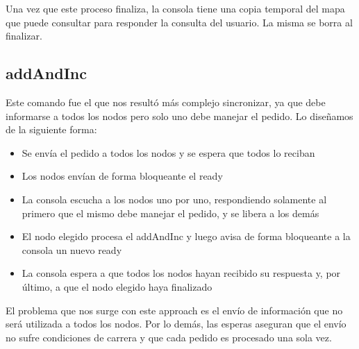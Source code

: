 Una vez que este proceso finaliza, la consola tiene una copia temporal del mapa que puede consultar para responder la consulta del usuario. La misma se borra al finalizar.

\subsection{addAndInc}

Este comando fue el que nos resultó más complejo sincronizar, ya que debe informarse a todos los nodos pero solo uno debe manejar el pedido. Lo diseñamos de la siguiente forma:

\begin{itemize}
	\item Se envía el pedido a todos los nodos y se espera que todos lo reciban

	\item Los nodos envían de forma bloqueante el ready

	\item La consola escucha a los nodos uno por uno, respondiendo solamente al primero que el mismo debe manejar el pedido, y se libera a los demás

	\item El nodo elegido procesa el addAndInc y luego avisa de forma bloqueante a la consola un nuevo ready

	\item La consola espera a que todos los nodos hayan recibido su respuesta y, por último, a que el nodo elegido haya finalizado
\end{itemize}

El problema que nos surge con este approach es el envío de información que no será utilizada a todos los nodos. Por lo demás, las esperas aseguran que el envío no sufre condiciones de carrera y que cada pedido es procesado una sola vez.